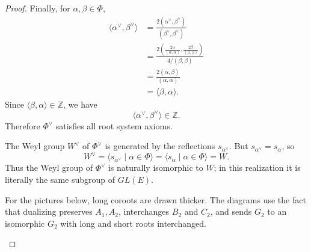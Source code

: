 \begin{proof}
    Finally, for \(\alpha,\beta\in\Phi\),
    \[
    \begin{aligned}
        \langle \alpha^\vee,\beta^\vee\rangle
        &=
        \frac{2(\alpha^\vee,\beta^\vee)}
             {(\beta^\vee,\beta^\vee)}                                      \\[4pt]
        &=
        \frac{
            2\left(
            \frac{2\alpha}{(\alpha,\alpha)},
            \frac{2\beta}{(\beta,\beta)}
            \right)}
            {4/(\beta,\beta)}                                                \\[4pt]
        &=
        \frac{2(\alpha,\beta)}{(\alpha,\alpha)}                              \\[4pt]
        &=
        \langle \beta,\alpha\rangle.
    \end{aligned}
    \]
    Since \(\langle \beta,\alpha\rangle\in\mathbb Z\), we have
    \[
        \langle \alpha^\vee,\beta^\vee\rangle\in\mathbb Z.
    \]
    Therefore \(\Phi^\vee\) satisfies all root system axioms.
    
    The Weyl group \(W^\vee\) of \(\Phi^\vee\) is generated by the reflections
    \(s_{\alpha^\vee}\). But \(s_{\alpha^\vee}=s_\alpha\), so
    \[
        W^\vee=\langle s_{\alpha^\vee}\mid \alpha\in\Phi\rangle
        =
        \langle s_\alpha\mid \alpha\in\Phi\rangle
        =
        W.
    \]
    Thus the Weyl group of \(\Phi^\vee\) is naturally isomorphic to \(W\);
    in this realization it is literally the same subgroup of \(GL(E)\).
    
    For the pictures below, long coroots are drawn thicker. The diagrams use
    the fact that dualizing preserves \(A_1,A_2\), interchanges \(B_2\) and
    \(C_2\), and sends \(G_2\) to an isomorphic \(G_2\) with long and short
    roots interchanged.
    
    \begin{center}
\end{center}
\end{proof}
